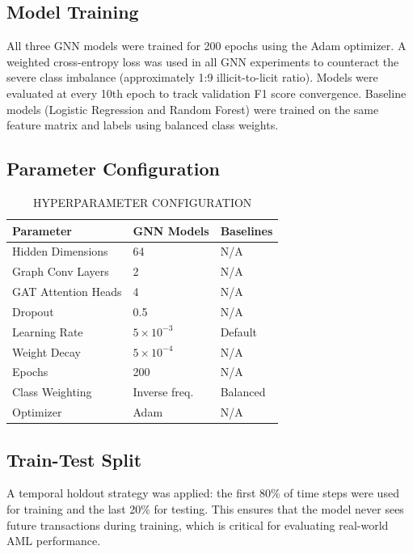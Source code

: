 \documentclass[conference]{IEEEtran}
\begin{document}
\subsection{Model Training}
All three GNN models were trained for 200 epochs using the Adam optimizer. A weighted cross-entropy loss was used in all GNN experiments to counteract the severe class imbalance (approximately 1:9 illicit-to-licit ratio). Models were evaluated at every 10th epoch to track validation F1 score convergence. Baseline models (Logistic Regression and Random Forest) were trained on the same feature matrix and labels using balanced class weights.

\subsection{Parameter Configuration}

\begin{table}[htbp]
\caption{HYPERPARAMETER CONFIGURATION}
\centering
\begin{tabular}{|l|l|l|}
\hline
\textbf{Parameter} & \textbf{GNN Models} & \textbf{Baselines} \\
\hline
Hidden Dimensions & 64 & N/A \\
Graph Conv Layers & 2 & N/A \\
GAT Attention Heads & 4 & N/A \\
Dropout & 0.5 & N/A \\
Learning Rate & \(5 \times 10^{-3}\) & Default \\
Weight Decay & \(5 \times 10^{-4}\) & N/A \\
Epochs & 200 & N/A \\
Class Weighting & Inverse freq. & Balanced \\
Optimizer & Adam & N/A \\
\hline
\end{tabular}
\label{tab:hyperparams}
\end{table}

\subsection{Train-Test Split}
A temporal holdout strategy was applied: the first 80\% of time steps were used for training and the last 20\% for testing. This ensures that the model never sees future transactions during training, which is critical for evaluating real-world AML performance.

\end{document}
